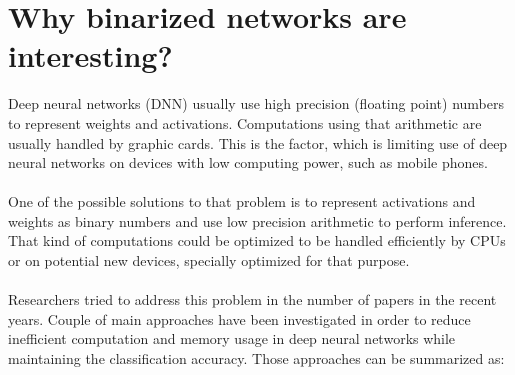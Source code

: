\documentclass[licencjacka]{pracamgr}
\begin{document}
	\section{Why binarized networks are interesting?}
	Deep neural networks (DNN) usually use high precision (floating point) numbers to represent
	weights and activations. Computations using that arithmetic are usually handled by
	graphic cards. This is the factor, which is limiting use of deep neural networks on devices with low computing power, such as mobile phones.
	\\\\
	One of the possible solutions to that problem is to represent activations and weights as
	binary numbers and use low precision arithmetic to perform inference. That kind of computations could be optimized to be handled efficiently by CPUs or on potential new devices, specially optimized for that purpose. 
	\\\\
	Researchers tried to address this problem in the number of papers in the recent years. Couple of main approaches have been investigated in order to reduce inefficient computation and memory usage in deep neural networks while maintaining the classification accuracy. Those approaches can be summarized as:
\end{document}

